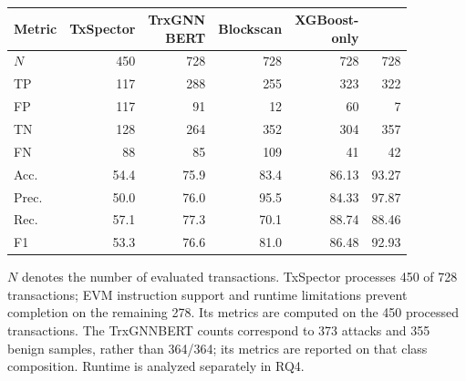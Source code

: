 \begin{table}[t]
\centering\color{blue}\small
\caption{}
\label{tab:performance-dsystem-compact}
\setlength{\tabcolsep}{2pt}
\begin{tabular}{@{}lrrrrr@{}}
\toprule
Metric & TxSpector & \makecell{TrxGNN\\BERT} & Blockscan & \makecell{XGBoost-\\only} & \approach{}\\
\midrule
$N$ &450&728&728&728&728\\
TP &117&288&255&323&322\\
FP &117&91&12&60&7\\
TN &128&264&352&304&357\\
FN &88&85&109&41&42\\
\midrule
Acc. &54.4&75.9&83.4&86.13&93.27\\
Prec. &50.0&76.0&95.5&84.33&97.87\\
Rec. &57.1&77.3&70.1&88.74&88.46\\
F1 &53.3&76.6&81.0&86.48&92.93\\
\bottomrule
\end{tabular}
\smallskip\par\footnotesize
$N$ denotes the number of evaluated transactions. TxSpector processes 450 of 728 transactions; EVM instruction support and runtime limitations prevent completion on the remaining 278. Its metrics are computed on the 450 processed transactions. The TrxGNNBERT counts correspond to 373 attacks and 355 benign samples, rather than 364/364; its metrics are reported on that class composition. Runtime is analyzed separately in RQ4.
\end{table}




